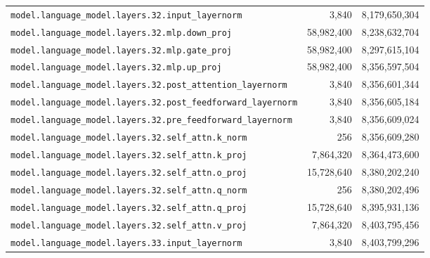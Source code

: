 \documentclass[10pt,a4paper]{article}
\theoremstyle{definition}
\begin{document}
\begin{appendices}
\begin{longtable}{p{9.5cm}rr}
\texttt{model.\allowbreak{}language\_model.\allowbreak{}layers.\allowbreak{}32.\allowbreak{}input\_layernorm} & 3,840 & 8,179,650,304 \\
\texttt{model.\allowbreak{}language\_model.\allowbreak{}layers.\allowbreak{}32.\allowbreak{}mlp.\allowbreak{}down\_proj} & 58,982,400 & 8,238,632,704 \\
\texttt{model.\allowbreak{}language\_model.\allowbreak{}layers.\allowbreak{}32.\allowbreak{}mlp.\allowbreak{}gate\_proj} & 58,982,400 & 8,297,615,104 \\
\texttt{model.\allowbreak{}language\_model.\allowbreak{}layers.\allowbreak{}32.\allowbreak{}mlp.\allowbreak{}up\_proj} & 58,982,400 & 8,356,597,504 \\
\texttt{model.\allowbreak{}language\_model.\allowbreak{}layers.\allowbreak{}32.\allowbreak{}post\_attention\_layernorm} & 3,840 & 8,356,601,344 \\
\texttt{model.\allowbreak{}language\_model.\allowbreak{}layers.\allowbreak{}32.\allowbreak{}post\_feedforward\_layernorm} & 3,840 & 8,356,605,184 \\
\texttt{model.\allowbreak{}language\_model.\allowbreak{}layers.\allowbreak{}32.\allowbreak{}pre\_feedforward\_layernorm} & 3,840 & 8,356,609,024 \\
\texttt{model.\allowbreak{}language\_model.\allowbreak{}layers.\allowbreak{}32.\allowbreak{}self\_attn.\allowbreak{}k\_norm} & 256 & 8,356,609,280 \\
\texttt{model.\allowbreak{}language\_model.\allowbreak{}layers.\allowbreak{}32.\allowbreak{}self\_attn.\allowbreak{}k\_proj} & 7,864,320 & 8,364,473,600 \\
\texttt{model.\allowbreak{}language\_model.\allowbreak{}layers.\allowbreak{}32.\allowbreak{}self\_attn.\allowbreak{}o\_proj} & 15,728,640 & 8,380,202,240 \\
\texttt{model.\allowbreak{}language\_model.\allowbreak{}layers.\allowbreak{}32.\allowbreak{}self\_attn.\allowbreak{}q\_norm} & 256 & 8,380,202,496 \\
\texttt{model.\allowbreak{}language\_model.\allowbreak{}layers.\allowbreak{}32.\allowbreak{}self\_attn.\allowbreak{}q\_proj} & 15,728,640 & 8,395,931,136 \\
\texttt{model.\allowbreak{}language\_model.\allowbreak{}layers.\allowbreak{}32.\allowbreak{}self\_attn.\allowbreak{}v\_proj} & 7,864,320 & 8,403,795,456 \\
\texttt{model.\allowbreak{}language\_model.\allowbreak{}layers.\allowbreak{}33.\allowbreak{}input\_layernorm} & 3,840 & 8,403,799,296 \\

\end{longtable}
\end{appendices}
\end{document}
